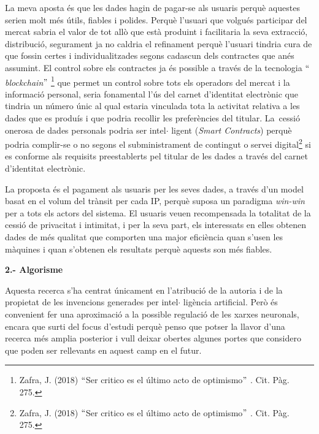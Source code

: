 \documentclass[12pt]{article}
\renewcommand{\_}{\kern-1.5pt\textunderscore\kern-1.5pt}
\begin{document}
\begin{itemize}
\vspace{\baselineskip}
\begin{justify}
La meva aposta és que les dades hagin de pagar-se als usuaris perquè aquestes serien molt més útils, fiables i polides. Perquè l’usuari que volgués participar del mercat sabria el valor de tot allò que està produint i facilitaria la seva extracció, distribució, segurament ja no caldria el refinament perquè l’usuari tindria cura de que fossin certes i individualitzades segons cadascun dels contractes que anés assumint.  El control sobre els contractes ja és possible a través de la tecnologia $``$\textit{blockchain}$"$ \footnote{ Zafra, J. (2018) $``$Ser critico es el último acto de optimismo$"$ . Cit. Pàg. 275. } que permet un control sobre tots els operadors del mercat i la informació personal, seria fonamental l’ús del carnet d’identitat electrònic que tindria un número únic al qual estaria vinculada tota la activitat relativa a les dades que es produís i que podria recollir les preferències del titular. La\  cessió onerosa de dades personals podria ser intel$ \cdot $ ligent (\textit{Smart Contracts}) perquè podria complir-se o no segons el subministrament de contingut o servei digital\footnote{ Zafra, J. (2018) $``$Ser critico es el último acto de optimismo$"$ . Cit. Pàg. 275. } si es conforme als requisits preestablerts pel titular de les dades a través del carnet d’identitat electrònic. 
\end{justify}\par

\begin{justify}
La proposta és el pagament als usuaris per les seves dades, a través d’un model basat en el volum del trànsit per cada IP, perquè suposa un paradigma \textit{win-win} per a tots els actors del sistema. El usuaris veuen recompensada la totalitat de la cessió de privacitat i intimitat, i per la seva part, els interessats en elles obtenen dades de més qualitat que comporten una major eficiència quan s’usen les màquines i quan s’obtenen els resultats perquè aquests son més fiables. 
\end{justify}\par


\vspace{\baselineskip}
\textbf{2.- Algorisme}\par


\vspace{\baselineskip}
\begin{justify}
Aquesta recerca s’ha centrat únicament en l’atribució de la autoria i de la propietat de les invencions generades per intel$ \cdot $ ligència artificial. Però és convenient fer una aproximació a la possible regulació de les xarxes neuronals, encara que surti del focus d’estudi perquè penso que potser la llavor d’una recerca més amplia posterior i vull deixar obertes algunes portes que considero que poden ser rellevants en aquest camp en el futur. 
\end{justify}\par



\end{itemize}
\end{document}
